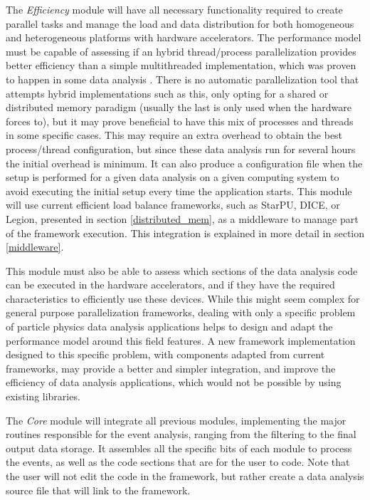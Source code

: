 The \textit{Efficiency} module will have all necessary functionality required to create parallel tasks and manage the load and data distribution for both homogeneous and heterogeneous platforms with hardware accelerators. The performance model must be capable of assessing if an hybrid thread/process parallelization provides better efficiency than a simple multithreaded implementation, which was proven to happen in some data analysis \cite{paperAMP}. There is no automatic parallelization tool that attempts hybrid implementations such as this, only opting for a shared or distributed memory paradigm (usually the last is only used when the hardware forces to), but it may prove beneficial to have this mix of processes and threads in some specific cases. This may require an extra overhead to obtain the best process/thread configuration, but since these data analysis run for several hours the initial overhead is minimum. It can also produce a configuration file when the setup is performed for a given data analysis on a given computing system to avoid executing the initial setup every time the application starts. This module will use current efficient load balance frameworks, such as StarPU, DICE, or Legion, presented in section \ref{distributed_mem}, as a middleware to manage part of the framework execution. This integration is explained in more detail in section \ref{middleware}.

This module must also be able to assess which sections of the data analysis code can be executed in the hardware accelerators, and if they have the required characteristics to efficiently use these devices. While this might seem complex for general purpose parallelization frameworks, dealing with only a specific problem of particle physics data analysis applications helps to design and adapt the performance model around this field features. A new framework implementation designed to this specific problem, with components adapted from current frameworks, may provide a better and simpler integration, and improve the efficiency of data analysis applications, which would not be possible by using existing libraries.

The \textit{Core} module will integrate all previous modules, implementing the major routines responsible for the event analysis, ranging from the filtering to the final output data storage. It assembles all the specific bits of each module to process the events, as well as the code sections that are for the user to code. Note that the user will not edit the code in the framework, but rather create a data analysis source file that will link to the framework.

